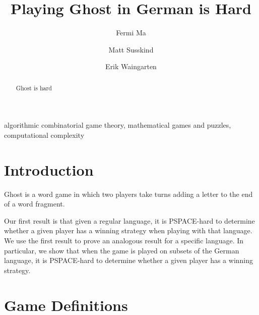 \documentclass[runningheads,a4paper]{llncs}
\newcommand{\keywords}[1]{\par\addvspace\baselineskip
\noindent\keywordname\enspace\ignorespaces#1}
\begin{document}
\mainmatter  

\title{Playing Ghost in German is Hard}


\author{Fermi Ma
\and Matt Susskind \and Erik Waingarten}
%


%
%

\maketitle


\begin{abstract}
Ghost is hard
\end{abstract}

\keywords{algorithmic combinatorial game theory, mathematical games and puzzles, computational complexity}

\section{Introduction}

Ghost is a word game in which two players take turns adding a letter to the end of a word fragment. 

	Our first result is that given a regular language, it is PSPACE-hard to determine whether a given player has a winning strategy when playing with that language. We use the first result to prove an analogous result for a specific language. In particular, we show that when the game is played on subsets of the German language, it is PSPACE-hard to determine whether a given player has a winning strategy.

\section{Game Definitions}
\label{Game Definitions}
\end{document}
